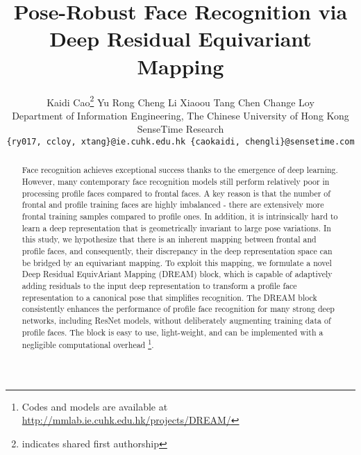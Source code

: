 \documentclass[10pt,twocolumn,letterpaper]{article}
\newcommand*\samethanks[1][\value{footnote}]{\footnotemark[#1]}
\begin{document}
\title{Pose-Robust Face Recognition via Deep Residual Equivariant Mapping}





\author{
Kaidi Cao\thanks{indicates shared first authorship} \hspace{9pt} Yu Rong\samethanks \hspace{9pt} Cheng Li \hspace{9pt} Xiaoou Tang \hspace{8pt}  Chen Change Loy\\
\small{Department of Information Engineering, The Chinese University of Hong Kong}\\
\small{SenseTime Research}\\
{\tt\small \{ry017, ccloy, xtang\}@ie.cuhk.edu.hk \hspace{5pt} \{caokaidi, chengli\}@sensetime.com}
}


\maketitle
\thispagestyle{empty}

\begin{abstract}
Face recognition achieves exceptional success thanks to the emergence of deep learning. However, many contemporary face recognition models still perform relatively poor in processing profile faces compared to frontal faces. A key reason is that the number of frontal and profile training faces are highly imbalanced - there are extensively more frontal training samples compared to profile ones. In addition, it is intrinsically hard to learn a deep representation that is geometrically invariant to large pose variations.
In this study, we hypothesize that there is an inherent mapping between frontal and profile faces, and consequently, their discrepancy in the deep representation space can be bridged by an equivariant mapping. To exploit this mapping, we formulate a novel Deep Residual EquivAriant Mapping (DREAM) block, which is capable of adaptively adding residuals to the input deep representation to transform a profile face representation to a canonical pose that simplifies recognition.
The DREAM block consistently enhances the performance of profile face recognition for many strong deep networks, including ResNet models, without deliberately augmenting training data of profile faces. The block is easy to use, light-weight, and can be implemented with a negligible computational overhead \footnote{Codes and models are available at \url{http://mmlab.ie.cuhk.edu.hk/projects/DREAM/}}. 
\end{abstract}
\end{document}
